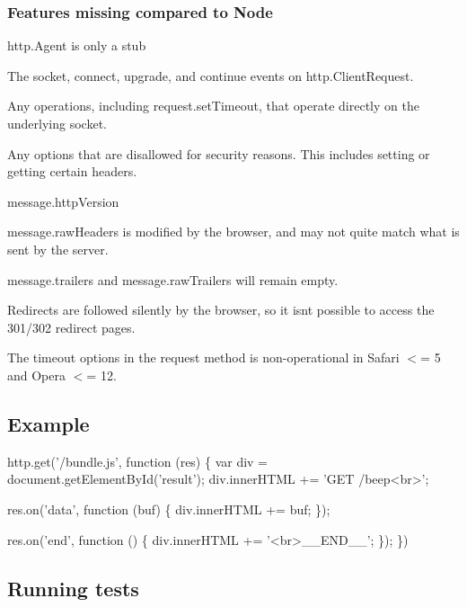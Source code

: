 \subsubsection*{Features missing compared to Node}


\begin{DoxyItemize}
\item {\ttfamily http.\+Agent} is only a stub
\item The \textquotesingle{}socket\textquotesingle{}, \textquotesingle{}connect\textquotesingle{}, \textquotesingle{}upgrade\textquotesingle{}, and \textquotesingle{}continue\textquotesingle{} events on {\ttfamily http.\+Client\+Request}.
\item Any operations, including {\ttfamily request.\+set\+Timeout}, that operate directly on the underlying socket.
\item Any options that are disallowed for security reasons. This includes setting or getting certain headers.
\item {\ttfamily message.\+http\+Version}
\item {\ttfamily message.\+raw\+Headers} is modified by the browser, and may not quite match what is sent by the server.
\item {\ttfamily message.\+trailers} and {\ttfamily message.\+raw\+Trailers} will remain empty.
\item Redirects are followed silently by the browser, so it isn\textquotesingle{}t possible to access the 301/302 redirect pages.
\item The {\ttfamily timeout} options in the {\ttfamily request} method is non-\/operational in Safari $<$= 5 and Opera $<$= 12.
\end{DoxyItemize}

\subsection*{Example}


\begin{DoxyCode}
http.get('/bundle.js', function (res) \{
    var div = document.getElementById('result');
    div.innerHTML += 'GET /beep<br>';

    res.on('data', function (buf) \{
        div.innerHTML += buf;
    \});

    res.on('end', function () \{
        div.innerHTML += '<br>\_\_END\_\_';
    \});
\})
\end{DoxyCode}


\subsection*{Running tests}

